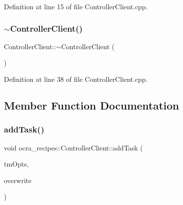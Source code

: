 Definition at line 15 of file Controller\+Client.\+cpp.

\hypertarget{classocra__recipes_1_1ControllerClient_a75faf6691be6c622deba404514c7ed70}{}\label{classocra__recipes_1_1ControllerClient_a75faf6691be6c622deba404514c7ed70} 
\subsubsection{\texorpdfstring{$\sim$\+Controller\+Client()}{~ControllerClient()}}
{\footnotesize\ttfamily Controller\+Client\+::$\sim$\+Controller\+Client (\begin{DoxyParamCaption}{ }\end{DoxyParamCaption})\hspace{0.3cm}{\ttfamily [virtual]}}



Definition at line 38 of file Controller\+Client.\+cpp.



\subsection{Member Function Documentation}
\hypertarget{classocra__recipes_1_1ControllerClient_a1f08768f37915c62b88e29d8db1ba27c}{}\label{classocra__recipes_1_1ControllerClient_a1f08768f37915c62b88e29d8db1ba27c} 
\subsubsection{\texorpdfstring{add\+Task()}{addTask()}}
{\footnotesize\ttfamily void ocra\+\_\+recipes\+::\+Controller\+Client\+::add\+Task (\begin{DoxyParamCaption}\item[{\hyperlink{classocra_1_1TaskBuilderOptions}{ocra\+::\+Task\+Builder\+Options} \&}]{tm\+Opts,  }\item[{bool}]{overwrite }\end{DoxyParamCaption})}

\hypertarget{classocra__recipes_1_1ControllerClient_a4e86ce713e96089dd2b53aec1d8ff3e3}{}\label{classocra__recipes_1_1ControllerClient_a4e86ce713e96089dd2b53aec1d8ff3e3} 
